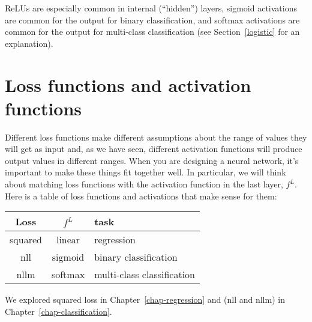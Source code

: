 ReLUs are especially common in internal (``hidden'') layers, 
sigmoid activations are common for the output for binary
classification, and softmax activations are common for the output for multi-class classification
(see Section~\ref{logistic} for an explanation).

\section{Loss functions and activation functions}
Different loss functions make different assumptions about the range of
values they will get as input and, as we have seen, different
activation functions will produce output values in different ranges.
When you are designing a neural network, it's important to make these
things fit together well.  In particular, we will think about matching
loss functions with the activation function in the last layer, $f^L$.
Here is a table of loss functions and activations that make sense for them:
\begin{center}
  \begin{tabular}{c c l}
    Loss       & $f^L$   & task                       \\
    \hline
    squared    & linear  & regression                 \\
    {\sc nll}  & sigmoid & binary classification             \\
    {\sc nllm} & softmax & multi-class classification
  \end{tabular}
\end{center}
We explored squared loss in Chapter~\ref{chap-regression} and ({\sc nll} and {\sc nllm}) in
Chapter~\ref{chap-classification}.




